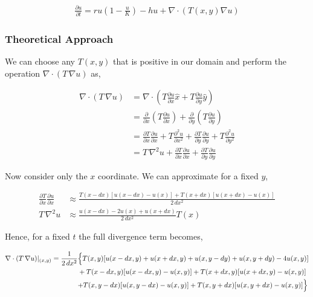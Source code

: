 \begin{align}
    \frac{\partial u}{\partial t} = ru\left(1-\frac{u}{K}\right) - hu + \nabla \cdot (T(x, y) \nabla u)
\end{align}

\subsubsection{Theoretical Approach}
We can choose any $T(x,y)$ that is positive in our domain and perform the operation $\nabla \cdot (T\,\nabla u)$ as,

\begin{align}
    \nabla \cdot (T\,\nabla u) &= \nabla \cdot \left(T\frac{\partial u}{\partial x} \hat{x} + T\frac{\partial u}{\partial y} \hat{y} \right) \nonumber\\
&= \frac{\partial}{\partial x}\left(T\frac{\partial u}{\partial x}\right)  + \frac{\partial}{\partial y}\left(T\frac{\partial u}{\partial y}\right) \nonumber\\
&= \frac{\partial T}{\partial x}\frac{\partial u}{\partial x} + T\frac{\partial^2 u}{\partial x^2} + \frac{\partial T}{\partial y}\frac{\partial u}{\partial y} + T\frac{\partial^2 u}{\partial y^2} \nonumber\\
&= T\,\nabla^2 u + \frac{\partial T}{\partial x}\frac{\partial u}{\partial x} + \frac{\partial T}{\partial y}\frac{\partial u}{\partial y}
\end{align}

Now consider only the $x$ coordinate. We can approximate for a fixed $y$,

\begin{align}
    \frac{\partial T}{\partial x}\frac{\partial u}{\partial x} &\approx \frac{T(x-dx)[u(x-dx)-u(x)] + T(x+dx)[u(x+dx)-u(x)]}{2\,dx^2}\\
T\,\nabla^2 u &\approx \frac{u(x-dx)-2u(x)+u(x+dx)}{2\,dx^2}T(x)
\end{align}

Hence, for a fixed $t$ the full divergence term becomes, 

\begin{align}
\nabla \cdot (T\,\nabla u)|_{(x,y)} = \frac{1}{2\,dx^2} & \Bigl\{ T(x,y) [u(x-dx,y)+u(x+dx,y)+u(x,y-dy)+u(x,y+dy)-4u(x,y)] \Bigl. \nonumber
\\ &+T(x-dx,y)[u(x-dx,y)-u(x,y)] + T(x+dx,y)[u(x+dx,y)-u(x,y)] \nonumber\\ 
&\Bigl. +
T(x,y-dx)[u(x,y-dx)-u(x,y)]+T(x,y+dx)[u(x,y+dx)-u(x,y)]\Bigl\}
\end{align}

